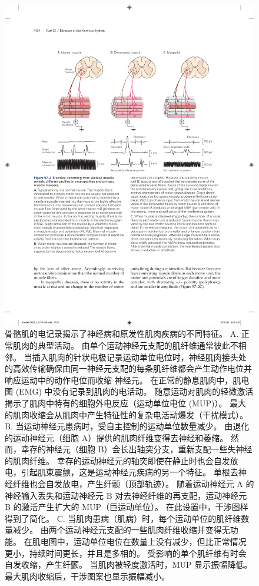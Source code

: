 \begin{figure}[htbp]
	\centering
	\includegraphics[width=0.8\linewidth]{chap57/fig_57_2}
	\caption{骨骼肌的电记录揭示了神经病和原发性肌肉疾病的不同特征。 A. 正常肌肉的典型活动。 由单个运动神经元支配的肌纤维通常彼此不相邻。 当插入肌肉的针状电极记录运动单位电位时，神经肌肉接头处的高效传输确保由同一神经元支配的每条肌纤维都会产生动作电位并响应运动中的动作电位而收缩 神经元。 在正常的静息肌肉中，肌电图 (EMG) 中没有记录到肌肉的电活动。 随意运动对肌肉的轻微激活揭示了肌肉中特有的细胞外电反应（运动单位电位 (MUP)）。 最大的肌肉收缩会从肌肉中产生特征性的复杂电活动爆发（干扰模式）。 B. 当运动神经元患病时，受自主控制的运动单位数量减少。 由退化的运动神经元（细胞 A）提供的肌肉纤维变得去神经和萎缩。 然而，幸存的神经元（细胞 B）会长出轴突分支，重新支配一些失神经的肌肉纤维。 幸存的运动神经元的轴突即使在静止时也会自发放电，引起肌束震颤，这是运动神经元疾病的另一个特征。 单根去神经纤维也会自发放电，产生纤颤（顶部轨迹）。 随着运动神经元 A 的神经输入丢失和运动神经元 B 对去神经纤维的再支配，运动神经元 B 的激活产生扩大的 MUP（巨运动单位）。 在此设置中，干涉图样得到了简化。 C. 当肌肉患病（肌病）时，每个运动单位的肌纤维数量减少。 由两个运动神经元支配的一些肌肉纤维收缩并变得无功能。 在肌电图中，运动单位电位在数量上没有减少，但比正常情况更小，持续时间更长，并且是多相的。 受影响的单个肌纤维有时会自发收缩，产生纤颤。 当肌肉被轻度激活时，MUP 显示振幅降低。 最大肌肉收缩后，干涉图案也显示振幅减小。}
	\label{fig:57_2}
\end{figure}


